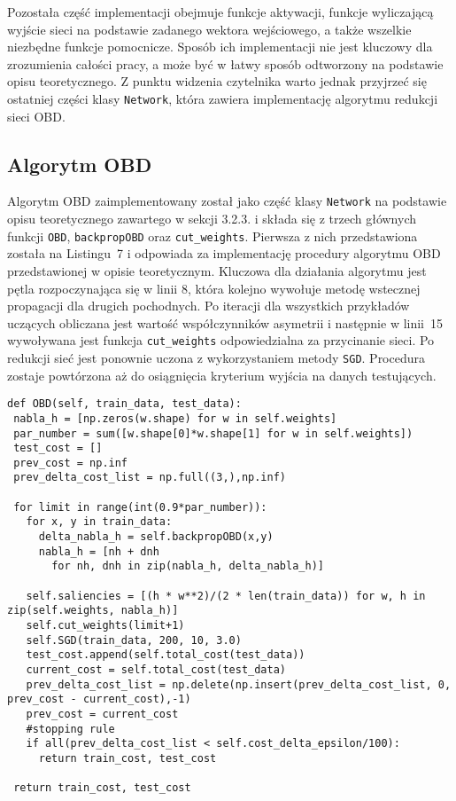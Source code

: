 \par Pozostała część implementacji obejmuje funkcje aktywacji, funkcje wyliczającą wyjście sieci na podstawie zadanego wektora wejściowego, a także wszelkie niezbędne funkcje pomocnicze. Sposób ich implementacji nie jest kluczowy dla zrozumienia całości pracy, a może być w łatwy sposób odtworzony na podstawie opisu teoretycznego. Z punktu widzenia czytelnika warto jednak przyjrzeć się ostatniej części klasy \texttt{Network}, która zawiera implementację algorytmu redukcji sieci OBD.

\subsection{Algorytm OBD}
Algorytm OBD zaimplementowany został jako część klasy \texttt{Network} na podstawie opisu teoretycznego zawartego w sekcji 3.2.3. i składa się z trzech głównych funkcji \texttt{OBD}, \texttt{backpropOBD} oraz \texttt{cut{\_}weights}. Pierwsza z nich przedstawiona została na Listingu~7 i odpowiada za implementację procedury algorytmu OBD  przedstawionej w opisie teoretycznym. Kluczowa dla działania algorytmu jest pętla rozpoczynająca się w linii 8, która kolejno wywołuje metodę wstecznej propagacji dla drugich pochodnych. Po iteracji dla wszystkich przykładów uczących obliczana jest wartość współczynników asymetrii i następnie w linii~15 wywoływana jest funkcja \texttt{cut{\_}weights} odpowiedzialna za przycinanie sieci. Po redukcji sieć jest ponownie uczona z wykorzystaniem metody \texttt{SGD}. Procedura zostaje powtórzona aż do osiągnięcia kryterium wyjścia na danych testujących.
\begin{listing}[!htb]
\begin{verbatim}
def OBD(self, train_data, test_data):
 nabla_h = [np.zeros(w.shape) for w in self.weights]
 par_number = sum([w.shape[0]*w.shape[1] for w in self.weights])
 test_cost = []
 prev_cost = np.inf
 prev_delta_cost_list = np.full((3,),np.inf)

 for limit in range(int(0.9*par_number)):
   for x, y in train_data:
     delta_nabla_h = self.backpropOBD(x,y)
     nabla_h = [nh + dnh
       for nh, dnh in zip(nabla_h, delta_nabla_h)]

   self.saliencies = [(h * w**2)/(2 * len(train_data)) for w, h in zip(self.weights, nabla_h)]
   self.cut_weights(limit+1)
   self.SGD(train_data, 200, 10, 3.0)        
   test_cost.append(self.total_cost(test_data))    
   current_cost = self.total_cost(test_data)            
   prev_delta_cost_list = np.delete(np.insert(prev_delta_cost_list, 0, prev_cost - current_cost),-1)
   prev_cost = current_cost
   #stopping rule
   if all(prev_delta_cost_list < self.cost_delta_epsilon/100):
     return train_cost, test_cost 

 return train_cost, test_cost
\end{verbatim}
\end{listing}

